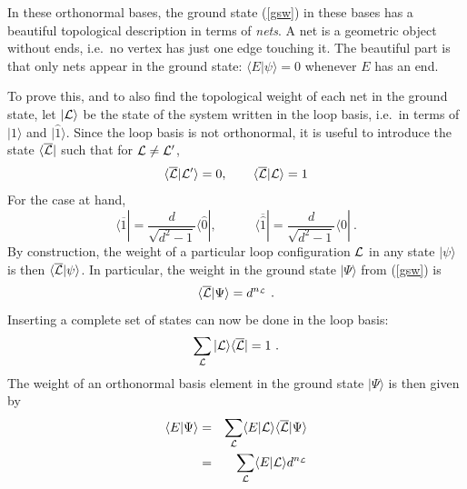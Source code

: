 \documentclass[11pt]{article}
\newcommand{\xxr}{|\widehat{1}\rangle}
\begin{document}
In these orthonormal bases, the ground state (\ref{gsw}) in these
bases has a beautiful topological description in terms of {\em nets}.
A net is a geometric object without ends, i.e.\ no vertex has just one
edge touching it. The beautiful part is that only nets
appear in the ground state: $\langle E|\psi\rangle = 0$ whenever $E$
has an end. 

To prove this, and to also find the topological weight of each net in
the ground state, let $|{\cal L}\rangle$ be the state of the system
written in the loop basis, i.e.\ in terms of $|1\rangle$ and
$\xxr$. Since the loop basis is not orthonormal, it is useful to
introduce the state $\langle \overline{\cal L}|$ such that for ${\cal
  L}\ne {\cal L}'$,
$$\langle\overline{\cal L}|{\cal L}'\rangle=0, \qquad
\langle\overline{\cal L}|{\cal L}\rangle=1$$
For the case at hand,
\begin{equation}
\langle\overline 1| = 
\frac{d}{\sqrt{d^2-1}}
\langle\widehat 0|, \qquad \quad
\langle\overline{\widehat 1}| = 
\frac{d}{\sqrt{d^2-1}}
\langle{0}| \ .
\label{barbasis}
\end{equation}
By construction, the weight of a particular loop configuration ${\cal
L}$ in any state $|\psi\rangle$ is then $\langle\overline{\cal
L}|\psi\rangle$. In particular, the weight in the ground state
$|\Psi\rangle$ from (\ref{gsw}) is
\begin{equation}
\langle\overline{\cal L}|\Psi\rangle=d^{n_{\cal L}} \ .
\end{equation}
Inserting a complete set of states can now be done in the loop basis:
$$\sum_{\cal L}|{\cal L}\rangle\langle\overline{\cal L}|=1\ .$$
The weight of an orthonormal basis element
in the ground state $|\Psi\rangle$ is then given by
\begin{eqnarray}
\nonumber
\langle E|\Psi\rangle &=& \sum_{\cal L} \langle E|{\cal L}\rangle
\langle \overline{\cal L}|\Psi\rangle\\ &=&
\sum_{\cal L} \langle E|{\cal L} \rangle d^{n_{\cal L}} 
\label{EPsi}
\end{eqnarray}
\end{document}

